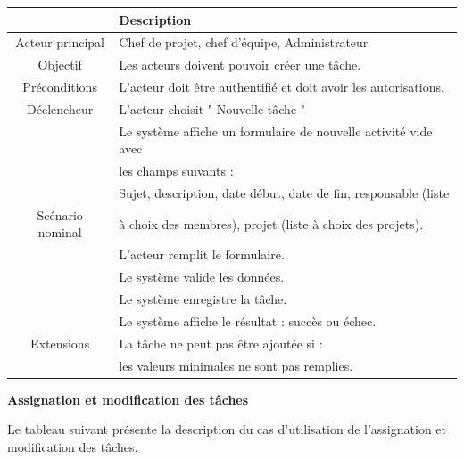 \begin{center}
\begin{tabular}{|c|l|}
\hline 
&\textbf { Description }\\\hline 
    Acteur principal & Chef de projet, chef d’équipe, Administrateur \\\hline 
    Objectif&Les acteurs doivent pouvoir créer une tâche.\\\hline
    Préconditions&L’acteur doit être authentifié et doit avoir les autorisations.  \\\hline 
    Déclencheur&L’acteur choisit " Nouvelle tâche "\\\hline 
    &Le système affiche un formulaire de nouvelle activité vide avec     \\
    &les champs suivants :    \\
    &Sujet, description, date début, date de fin, responsable (liste  \\
    Scénario nominal&à choix des membres), projet (liste à choix des projets).    \\
    & L’acteur remplit le formulaire.  \\
    &Le système valide les données. \\&Le système enregistre la tâche. \\&Le système affiche le résultat : succès ou échec.  \\\hline
    Extensions&La tâche ne peut pas être ajoutée si : \\&les valeurs minimales ne sont pas remplies.\\\hline
\end{tabular}
\label{desc_cree_tache}
\end{center}
\newpage
\par \textbf{  	 	 	Assignation et modification des tâches	}
\par Le tableau suivant présente la description du cas d'utilisation de l’assignation et modification des tâches.
